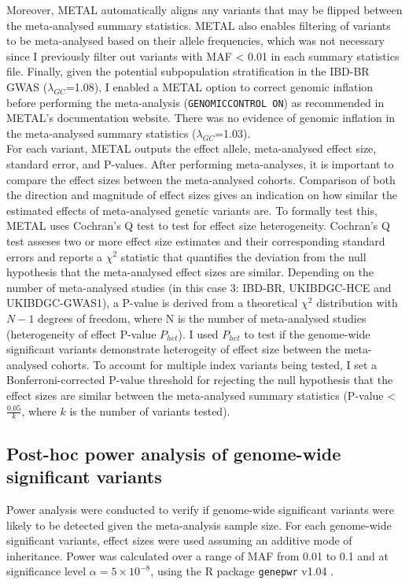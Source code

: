 Moreover, METAL automatically aligns any variants that may be flipped between the meta-analysed summary statistics. METAL also enables filtering of variants to be meta-analysed based on their allele frequencies, which was not necessary since I previously filter out variants with MAF < 0.01 in each summary statistics file. Finally, given the potential subpopulation stratification in the IBD-BR GWAS ($\lambda_{GC}$=1.08), I enabled a METAL option to correct genomic inflation before performing the meta-analysis (\Verb+GENOMICCONTROL ON+) as recommended in METAL's documentation website. There was no evidence of genomic inflation in the meta-analysed summary statistics ($\lambda_{GC}$=1.03).\\

For each variant, METAL outputs the effect allele, meta-analysed effect size, standard error, and P-values. After performing meta-analyses, it is important to compare the effect sizes between the meta-analysed cohorts. Comparison of both the direction and magnitude of effect sizes gives an indication on how similar the estimated effects of meta-analysed genetic variants are. To formally test this, METAL uses Cochran's Q test to test for effect size heterogeneity. Cochran's Q test asseses two or more effect size estimates and their corresponding standard errors and reports a $\chi^{2}$ statistic that quantifies the deviation from the null hypothesis that the meta-analysed effect sizes are similar. Depending on the number of meta-analysed studies (in this case 3: IBD-BR, UKIBDGC-HCE and UKIBDGC-GWAS1), a P-value is derived from a theoretical $\chi^{2}$ distribution with $N-1$ degrees of freedom, where N is the number of meta-analysed studies (heterogeneity of effect P-value $P_{het}$). I used $P_{het}$ to test if the genome-wide significant variants demonstrate heterogeity of effect size between the meta-analysed cohorts. To account for multiple index variants being tested, I set a Bonferroni-corrected P-value threshold for rejecting the null hypothesis that the effect sizes are similar between the meta-analysed summary statistics (P-value < $\frac{0.05}{k}$, where $k$ is the number of variants tested).

\subsection{Post-hoc power analysis of genome-wide significant variants}
Power analysis were conducted to verify if genome-wide significant variants were likely to be detected given the meta-analysis sample size. For each genome-wide significant variants, effect sizes were used assuming an additive mode of inheritance. Power was calculated over a range of MAF from 0.01 to 0.1 and at significance level $\alpha=5\times10^{-8}$, using the R package \Verb+genepwr+ v1.04 \cite{genepwr-docs}. 

